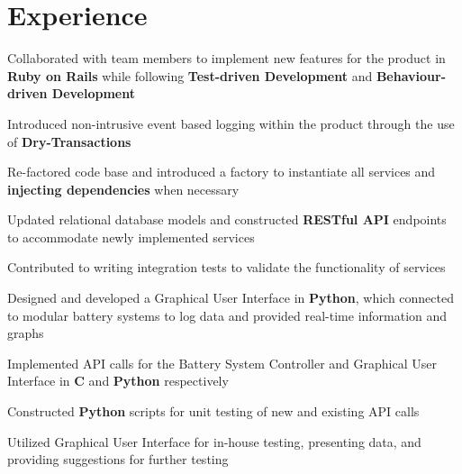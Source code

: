 \documentclass[letterpaper]{deedy-resume} %
\begin{document}
\begin{minipage}[t]{0.66\textwidth} %


\section{Experience}


\vspace{\topsep} %
\begin{tightitemize}
\item Collaborated with team members to implement new features for the product in \textbf{Ruby on Rails} while following \textbf{Test-driven Development} and \textbf{Behaviour-driven Development}
\item Introduced non-intrusive event based logging within the product through the use of \textbf{Dry-Transactions}
\item Re-factored code base and introduced a factory to instantiate all services and \textbf{injecting dependencies} when necessary
\item Updated relational database models and constructed \textbf{RESTful API} endpoints to accommodate newly implemented services 
\item Contributed to writing integration tests to validate the functionality of services
\end{tightitemize}

\sectionspace %



\begin{tightitemize}
\item Designed and developed a Graphical User Interface in \textbf{Python}, which connected to modular battery systems to log data and provided real-time information and graphs
\item Implemented API calls for the Battery System Controller and Graphical User Interface in \textbf{C} and \textbf{Python} respectively
\item Constructed \textbf{Python} scripts for unit testing of new and existing API calls
\item Utilized Graphical User Interface for in-house testing, presenting data, and providing suggestions for further testing
\end{tightitemize}


\end{minipage}
\end{document}
